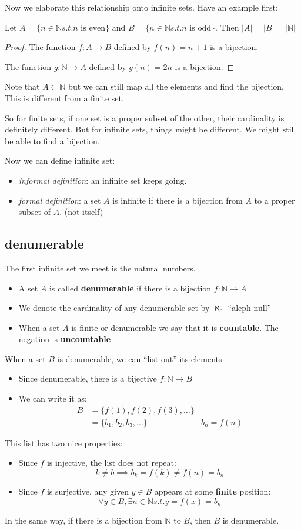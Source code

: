 \documentclass[letterpaper,12pt]{article}
\begin{document}
Now we elaborate this relationship onto infinite sets. Have an example first:

Let $A=\{n\in\mathbb{N}s.t.n \text{ is even}\}$ and $B=\{n\in\mathbb{N}s.t.n \text{ is odd}\}$. Then $|A|=|B|=|\mathbb{N}|$ \begin{proof}
    The function $f: A \to B$ defined by $f(n)=n+1$ is a bijection.

    The function $g: \mathbb{N} \to A$ defined by $g(n)=2n$ is a bijection.
\end{proof}
Note that $A\subset \mathbb{N}$ but we can still map all the elements and find the bijection. This is different from a finite set. 

So for finite sets, if one set is a proper subset of the other, their cardinality is definitely different. But for infinite sets, things might be different. We might still be able to find a bijection. 

Now we can define infinite set:\begin{itemize}
    \item \textit{informal definition}: an infinite set keeps going.
    \item \textit{formal definition}: a set $A$ is infinite if there is a bijection from $A$ to a proper subset of $A$. (not itself)
\end{itemize}

\subsection{denumerable}
The first infinite set we meet is the natural numbers.
\begin{itemize}
    \item A set $A$ is called \textbf{denumerable} if there is a bijection $f : \mathbb{N} \to A$
    \item We denote the cardinality of any denumerable set by $\aleph_0$ ``aleph-null''
    \item When a set $A$ is finite or denumerable we say that it is \textbf{countable}. The negation is \textbf{uncountable}
\end{itemize}

When a set $B$ is denumerable, we can ``list out'' its elements.\begin{itemize}
    \item Since denumerable, there is a bijective $f:\mathbb{N}\to B$
    \item We can write it as:\begin{align*}
        B&=\{f(1),f(2),f(3),\ldots\} &\\
        &=\{b_1,b_2,b_3,\ldots\}&b_n=f(n)
    \end{align*}
\end{itemize}
This list has two nice properties:\begin{itemize}
    \item Since $f$ is injective, the list does not repeat:\[k\neq b\implies b_k=f(k)\neq f(n)=b_n\]
    \item Since $f$ is surjective, any given $y\in B$ appears at some \textbf{finite} position:\[\forall y\in B, \exists n\in \mathbb{N}s.t.y=f(x)=b_n\]
\end{itemize}
In the same way, if there is a bijection from $\mathbb{N}$ to $B$, then $B$ is denumerable. 
\end{document}

